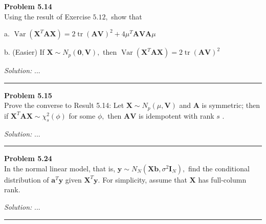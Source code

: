 \documentclass[a4paper, 11pt]{article}
\newenvironment{problem}[2][Problem]
    { \begin{mdframed}[backgroundcolor=gray!20] \textbf{#1 #2} \\}
    {  \end{mdframed}}
\newenvironment{solution}
    {\textit{Solution:}}
    {}
\begin{document}
\begin{problem}{5.14}
Using the result of Exercise $5.12,$ show that

a. $\operatorname{Var}\left(\mathbf{X}^{T} \mathbf{A X}\right)=2 \operatorname{tr}(\mathbf{A V})^{2}+4 \mu^{T} \mathbf{A V A} \mu$

b. (Easier) If $\mathbf{X} \sim N_{p}(\mathbf{0}, \mathbf{V}),$ then $\operatorname{Var}\left(\mathbf{X}^{T} \mathbf{A} \mathbf{X}\right)=2 \operatorname{tr}(\mathbf{A} \mathbf{V})^{2}$
\end{problem}
\begin{solution}
...
\end{solution} 

\noindent\rule{7in}{2.8pt}

\begin{problem}{5.15}
Prove the converse to Result 5.14: Let $\mathbf{X} \sim N_{p}(\mu, \mathbf{V})$ and $\mathbf{A}$ is symmetric; then if $\mathbf{X}^{T} \mathbf{A} \mathbf{X} \sim \chi_{s}^{2}(\phi)$ for some $\phi,$ then $\mathbf{A V}$ is idempotent with rank $s$ .
\end{problem}
\begin{solution}
...
\end{solution} 

\noindent\rule{7in}{2.8pt}

\begin{problem}{5.24}
In the normal linear model, that is, $\mathbf{y} \sim N_{N}\left(\mathbf{X b}, \sigma^{2} \mathbf{I}_{N}\right),$ find the conditional distribution of $\mathbf{a}^{T} \mathbf{y}$ given $\mathbf{X}^{T} \mathbf{y} .$ For simplicity, assume that $\mathbf{X}$ has full-column rank.
\end{problem}
\begin{solution}
...
\end{solution} 

\noindent\rule{7in}{2.8pt}
\end{document}
